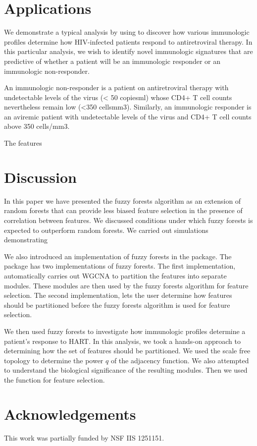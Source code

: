 \documentclass[article,shortnames]{jss}
\begin{document}
\section{Applications}
We demonstrate a typical analysis by using  to discover how various immunologic profiles 
determine how HIV-infected patients respond to antiretroviral therapy.  In this particular analysis,
we wish to identify novel immunologic signatures that are predictive of whether a patient will be an immunologic
responder or an immunologic non-responder.

An immunologic non-responder is a patient on antiretroviral therapy with undetectable levels of the virus (< 50 copies\/ml)
whose CD4+ T cell counts nevertheless remain low (<350 cells\/mm3).  Similarly, an immunologic responder is an aviremic
patient with undetectable levels of the virus and CD4+ T cell counts above 350 cells/mm3. 

The features 
  

\section{Discussion}
In this paper we have presented the fuzzy forests algorithm as an extension of random forests that can provide less biased feature selection in 
 the presence of correlation between features.  We discussed conditions under which fuzzy forests is expected
 to outperform random forests.  We carried out simulations demonstrating    
 
 We also introduced an implementation of fuzzy forests in the  package.  
 The  package has two implementations of fuzzy forests.  The first implementation,  automatically 
 carries out WGCNA to partition the features into separate modules.  These modules are then used by the fuzzy forests algorithm for feature selection.
 The second implementation,  lets the user determine how features should be partitioned before the fuzzy forests algorithm is used 
 for feature selection.  
 
We then used fuzzy forests to investigate how immunologic profiles determine a patient's response to HART.
 In this analysis, we took a hands-on approach to determining how the set of features
 should be partitioned.  We used the scale free topology to determine the power $q$ of the adjacency function.
 We also attempted to understand the biological significance of the resulting modules.
 Then we used the  function for feature selection.         
 
\section*{Acknowledgements}
This work was partially funded by NSF IIS 1251151.


\end{document}
